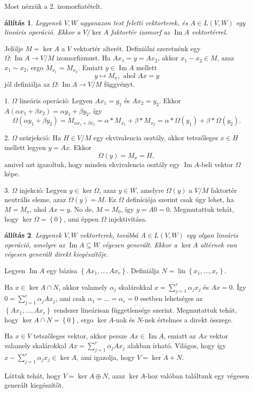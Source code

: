 \documentclass[a4paper, showtrims]{memoir}
\makeatletter
\renewenvironment{proof}[1][\proofname]
    {\par\pushQED{\qed}%
    \normalfont \topsep6\p@\@plus6\p@\relax
    \trivlist
    \item[\hskip\labelsep
        \itshape
    #1\@addpunct{:}]\ignorespaces}
    {\popQED\endtrivlist\@endpefalse}
\theoremstyle{plain}
\newtheorem{proposition}{állítás}[chapter]
\theoremstyle{remark}
\theoremstyle{definition}
\DeclareMathOperator{\lin}{lin}
\DeclareMathOperator{\im}{Im}
\makeatother
\begin{document}
Most nézzük a 2. izomorfiatételt.
\begin{proposition}
	Legyenek $V,W$ ugyanazon test feletti vektorterek,
	és $A\in L\left( V,W \right)$ egy lineáris operáció.
	Ekkor a
	\(
	V/\ker A
	\)
	faktortér izomorf az $\im A$ vektortérrel.
\end{proposition}
\begin{proof}
	Jelölje $M=\ker A$ a $V$ vektortér alterét.
	Definiálni szeretnénk egy $\Omega:\im A\to V/M$ izomorfizmust.
	Ha $Ax_1=y=Ax_2$, akkor $x_1-x_2\in M$, azaz $x_1\sim x_2$, ergo $M_{x_1}=M_{x_2}$.
	Emiatt $y\in\im A$ mellett
	\[
		y\mapsto M_x, \text{ ahol } Ax=y
	\]
	jól definiálja az $\Omega:\im A\to V/M$ függvényt.

	1. $\Omega$ lineáris operáció:
	Legyen $Ax_1=y_1$ és $Ax_2=y_2$.
	Ekkor
	$A\left( \alpha x_1+\beta x_2 \right)=\alpha y_1+\beta y_2$, így
	\[
		\Omega\left( \alpha y_1+\beta y_2 \right)
		=
		M_{\alpha x_1+\beta x_2}
		=
		\alpha\ast M_{x_1}+\beta\ast M_{x_2}
		=
		\alpha\ast \Omega\left( y_1 \right)+\beta\ast\Omega\left( y_2 \right).
	\]

	2. $\Omega$ szürjekció:
	Ha $H\in V/M$ egy ekvivalencia osztály,
	akkor tetszőleges $x\in H$ mellett legyen $y=Ax$.
	Ekkor
	\[
		\Omega\left( y \right)=M_x=H,
	\]
	amivel azt igazoltuk,
	hogy minden ekvivalencia osztály egy $\im A$-beli vektor $\Omega$ képe.


	3. $\Omega$ injekció:
	Legyen $y\in\ker\Omega$, azaz $y\in W$, amelyre $\Omega\left( y \right)$ a $V/M$ faktortér neutrális eleme,
	azaz
	$\Omega\left( y \right)=M$.
	Ez $\Omega$ definíciója szerint csak úgy lehet, ha $M=M_x$, ahol $Ax=y$.
	No de, $M=M_0$, így $y=A0=0$.
	Megmutattuk tehát, hogy $\ker \Omega=\left\{ 0 \right\}$,
	ami éppen $\Omega$ injektivitása.
\end{proof}
\begin{proposition}
	Legyenek $V,W$ vektorterek,
	továbbá $A\in L\left( V,W \right)$ egy olyan lineáris operáció,
	amelyre az $\im A\subseteq W$ végesen generált.
	Ekkor a $\ker A$ altérnek van végesen generált direkt kiegészítője.
\end{proposition}
\begin{proof}
	Legyen $\im A$ egy bázisa $\left\{ Ax_1,\ldots,Ax_r \right\}$.
	Definiálja $N=\lin\left\{ x_1,\ldots,x_r \right\}$.

	Ha $x\in\ker A\cap N$, akkor valamely $\alpha_j$ skalárokkal
	$x=\sum_{j=1}^r\alpha_jx_j$ és $Ax=0$.
	Így $0=\sum_{j=1}^r\alpha_jAx_j$, ami csak $\alpha_1=\ldots=\alpha_r=0$
	esetben lehetséges az $\left\{ Ax_1,\ldots,Ax_r \right\}$ rendszer lineárisan függetlensége szerint.
    Megmutattuk tehát, hogy $\ker A\cap N=\left\{ 0 \right\}$, ergo $\ker A$-nak és $N$-nek értelmes a direkt összege.

	Ha $x\in V$ tetszőleges vektor, akkor persze $Ax\in\im A$, emiatt
	az $Ax$ vektor valamely skalárokkal $Ax=\sum_{j=1}^r\alpha_jAx_j$ alakban írható.
	Világos, hogy így $x-\sum_{j=1}^r\alpha_jx_j\in\ker A$,
	ami igazolja, hogy $V=\ker A+N$.

	Láttuk tehát, 
    hogy $V=\ker A\oplus N$, 
    azaz $\ker A$-hoz valóban találtunk egy végesen generált kiegészítőt.
\end{proof}
\end{document}
